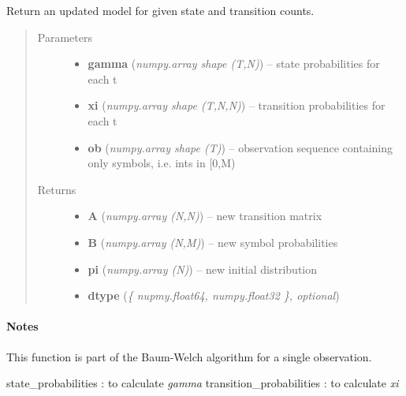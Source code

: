 \documentclass[letterpaper,10pt,english]{sphinxmanual}
\begin{document}

\begin{fulllineitems}
\label{hmm:kernel.python.update}
Return an updated model for given state and transition counts.
\begin{quote}\begin{description}
\item[{Parameters}] \leavevmode\begin{itemize}
\item {} 
\textbf{gamma} (\emph{numpy.array shape (T,N)}) --
state probabilities for each t

\item {} 
\textbf{xi} (\emph{numpy.array shape (T,N,N)}) --
transition probabilities for each t

\item {} 
\textbf{ob} (\emph{numpy.array shape (T)}) --
observation sequence containing only symbols, i.e. ints in {[}0,M)

\end{itemize}

\item[{Returns}] \leavevmode
\begin{itemize}
\item {} 
\textbf{A} (\emph{numpy.array (N,N)}) --
new transition matrix

\item {} 
\textbf{B} (\emph{numpy.array (N,M)}) --
new symbol probabilities

\item {} 
\textbf{pi} (\emph{numpy.array (N)}) --
new initial distribution

\item {} 
\textbf{dtype} (\emph{\{ nupmy.float64, numpy.float32 \}, optional})

\end{itemize}


\end{description}\end{quote}
\paragraph{Notes}

This function is part of the Baum-Welch algorithm for a single observation.




state\_probabilities : to calculate \emph{gamma}
transition\_probabilities : to calculate \emph{xi}



\end{fulllineitems}
\end{document}
